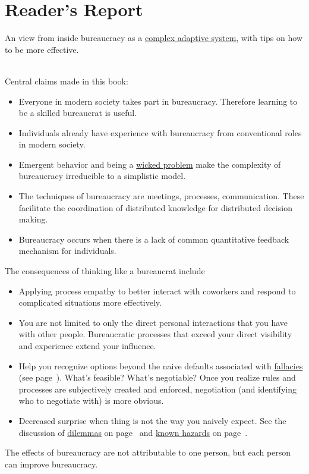 \section{Reader's Report\label{sec:reader-report}}
An view from inside bureaucracy as a \href{https://en.wikipedia.org/wiki/Complexity_theory_and_organizations}{complex adaptive system}, with tips on how to be more effective. 

\ \\
Central claims made in this book:
\begin{itemize}
    \item Everyone in modern society takes part in \gls{bureaucracy}. Therefore learning to be a skilled \gls{bureaucrat} is useful.
    \item Individuals already have experience with bureaucracy from conventional roles in modern society. 
    \item Emergent behavior and being a \href{https://en.wikipedia.org/wiki/Wicked_problem}{wicked problem} make the complexity of bureaucracy irreducible to a simplistic model.
    \item The techniques of bureaucracy are meetings, processes, communication. These facilitate the coordination of distributed knowledge for distributed decision making.  
    \item Bureaucracy occurs when there is a lack of common quantitative feedback mechanism for individuals.
\end{itemize}
The consequences of thinking like a bureaucrat include
\begin{itemize}
    \item Applying \gls{process empathy} to better interact with coworkers and respond to complicated situations more effectively.
    \item You are not limited to only the direct personal interactions that you have with other people. Bureaucratic processes that exceed your direct visibility and experience extend your influence.
    \item Help you recognize options beyond the naive defaults associated with \hyperref[sec:fallacies]{fallacies}
    (see page~\pageref{sec:fallacies}). 
    What's feasible? What's negotiable? Once you realize rules and processes are subjectively created and enforced, negotiation (and identifying who to negotiate with) is more obvious.
    \item Decreased surprise when thing is not the way you naively expect. See the discussion of \hyperref[sec:dilemma-trilemma]{dilemmas}
    on page~\pageref{sec:dilemma-trilemma} 
    and 
    \hyperref[sec:unavoidable-hazards]{known hazards}
    on page~\pageref{sec:unavoidable-hazards}.
\end{itemize}


The effects of bureaucracy are not attributable to one person, but each person can improve bureaucracy.